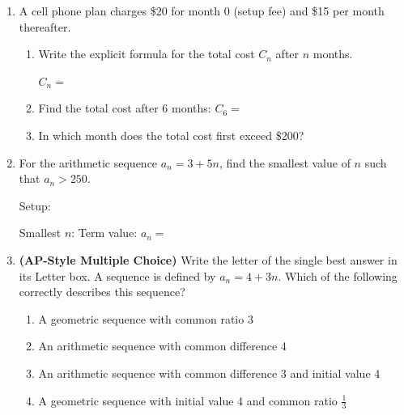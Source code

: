 \documentclass[10pt]{article}
\begin{document}
\begin{enumerate}[itemsep=16pt]
\item A cell phone plan charges \$20 for month 0 (setup fee) and \$15 per month thereafter.

      \begin{enumerate}[label=(\alph*), itemsep=8pt]
        \item Write the explicit formula for the total cost $C_n$ after $n$ months.

              $C_n = $ \smash{\gradedblank[id=hw3a, type=short, points=1, answer={20 + 15n}]{5cm}{13pt}}

        \item Find the total cost after 6 months: $C_6 = $ \smash{\gradedblank[id=hw3b, type=short, points=1, answer={110}, display={\$110}]{3cm}{13pt}}

        \item In which month does the total cost first exceed \$200? \smash{\gradedblank[id=hw3c, type=short, points=2, answer={13}, display={Month 13}]{3cm}{13pt}}
      \end{enumerate}

\item For the arithmetic sequence $a_n = 3 + 5n$, find the smallest value of $n$ such that
      $a_n > 250$.

      \vspace{0.06in}
      Setup: \smash{\gradedblank[id=hw4a, type=short, check=text, points=1, answer={3 + 5n > 250}, display={$3 + 5n > 250$}]{6cm}{13pt}}

      Smallest $n$: \smash{\gradedblank[id=hw4b, type=short, points=2, answer={50}]{2.5cm}{13pt}} \quad Term value: $a_n = $ \smash{\gradedblank[id=hw4c, type=short, points=1, answer={253}]{2.5cm}{13pt}}

\newpage
\item \textbf{(AP-Style Multiple Choice)} Write the letter of the single best answer in its Letter box. A sequence is defined by $a_n = 4 + 3n$.
      Which of the following correctly describes this sequence?

      \medskip
      \begin{enumerate}[label=(\Alph*), itemsep=4pt]
        \item A geometric sequence with common ratio 3
        \item An arithmetic sequence with common difference 4
        \item An arithmetic sequence with common difference 3 and initial value 4
        \item A geometric sequence with initial value 4 and common ratio $\frac{1}{3}$
      \end{enumerate}


\end{enumerate}
\end{document}
